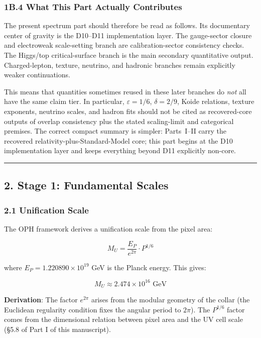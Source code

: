 \subsubsection{1B.4 What This Part Actually Contributes}\label{1b4-what-oph-achieves}

The present spectrum part should therefore be read as follows. Its documentary center of gravity is the D10--D11 implementation layer. The gauge-sector closure and electroweak scale-setting branch are calibration-sector consistency checks. The Higgs/top critical-surface branch is the main secondary quantitative output. Charged-lepton, texture, neutrino, and hadronic branches remain explicitly weaker continuations.

This means that quantities sometimes reused in these later branches do \emph{not} all have the same claim tier. In particular, \(\varepsilon=1/6\), \(\delta=2/9\), Koide relations, texture exponents, neutrino scales, and hadron fits should not be cited as recovered-core outputs of overlap consistency plus the stated scaling-limit and categorical premises. The correct compact summary is simpler: Parts~I--II carry the recovered relativity-plus-Standard-Model core; this part begins at the D10 implementation layer and keeps everything beyond D11 explicitly non-core.

\begin{center}\rule{0.5\linewidth}{0.5pt}\end{center}

\subsection{2. Stage 1: Fundamental Scales}\label{2-stage-1-fundamental-scales}

\subsubsection{2.1 Unification Scale}\label{21-unification-scale}

The OPH framework derives a unification scale from the pixel area:

\[M_U = \frac{E_P}{e^{2\pi}} \cdot P^{1/6}\]

where \(E_P = 1.220890 \times 10^{19}\) GeV is the Planck energy. This gives:

\[M_U \approx 2.474 \times 10^{16} \text{ GeV}\]

\textbf{Derivation}: The factor \(e^{2\pi}\) arises from the modular geometry of the collar (the Euclidean regularity condition fixes the angular period to \(2\pi\)). The \(P^{1/6}\) factor comes from the dimensional relation between pixel area and the UV cell scale (§5.8 of Part I of this manuscript).


